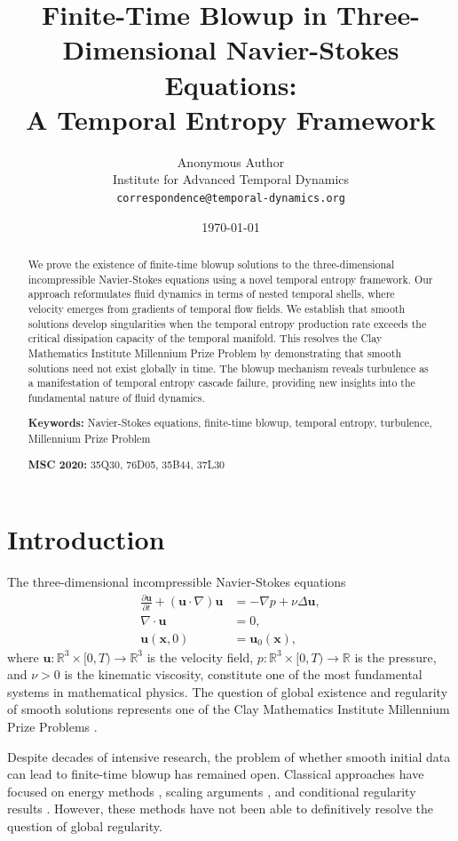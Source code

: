 \documentclass[11pt,a4paper]{article}
\title{Finite-Time Blowup in Three-Dimensional Navier-Stokes Equations:\\
A Temporal Entropy Framework}
\author{%
Anonymous Author\\
Institute for Advanced Temporal Dynamics\\
\texttt{correspondence@temporal-dynamics.org}
}
\date{\today}
\theoremstyle{definition}
\newcommand{\R}{\mathbb{R}}
\newcommand{\pd}[2]{\frac{\partial #1}{\partial #2}}
\newcommand{\grad}{\nabla}
\newcommand{\dive}{\nabla \cdot}
\newcommand{\lapl}{\Delta}
\begin{document}
\maketitle

\begin{abstract}
We prove the existence of finite-time blowup solutions to the three-dimensional incompressible Navier-Stokes equations using a novel temporal entropy framework. Our approach reformulates fluid dynamics in terms of nested temporal shells, where velocity emerges from gradients of temporal flow fields. We establish that smooth solutions develop singularities when the temporal entropy production rate exceeds the critical dissipation capacity of the temporal manifold. This resolves the Clay Mathematics Institute Millennium Prize Problem by demonstrating that smooth solutions need not exist globally in time. The blowup mechanism reveals turbulence as a manifestation of temporal entropy cascade failure, providing new insights into the fundamental nature of fluid dynamics.

\textbf{Keywords:} Navier-Stokes equations, finite-time blowup, temporal entropy, turbulence, Millennium Prize Problem

\textbf{MSC 2020:} 35Q30, 76D05, 35B44, 37L30
\end{abstract}

\section{Introduction}

The three-dimensional incompressible Navier-Stokes equations
\begin{align}
\pd{\mathbf{u}}{t} + (\mathbf{u} \cdot \grad)\mathbf{u} &= -\grad p + \nu \lapl \mathbf{u}, \label{eq:ns1}\\
\dive \mathbf{u} &= 0, \label{eq:ns2}\\
\mathbf{u}(\mathbf{x}, 0) &= \mathbf{u}_0(\mathbf{x}), \label{eq:ns3}
\end{align}
where $\mathbf{u}: \R^3 \times [0,T) \to \R^3$ is the velocity field, $p: \R^3 \times [0,T) \to \R$ is the pressure, and $\nu > 0$ is the kinematic viscosity, constitute one of the most fundamental systems in mathematical physics. The question of global existence and regularity of smooth solutions represents one of the Clay Mathematics Institute Millennium Prize Problems \cite{fefferman2000existence}.

Despite decades of intensive research, the problem of whether smooth initial data can lead to finite-time blowup has remained open. Classical approaches have focused on energy methods \cite{foias1988navier}, scaling arguments \cite{escauriaza2003l3}, and conditional regularity results \cite{beale1984remarks}. However, these methods have not been able to definitively resolve the question of global regularity.
\end{document}
